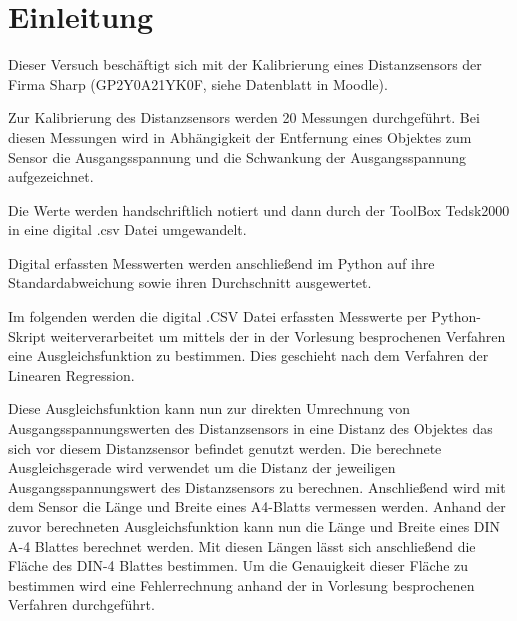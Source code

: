 \documentclass[12pt, oneside, a4paper, \docLanguage]{report}
\begin{document}

\setcounter{section}{0}



\clearpage

%
%


%
%


%
%


%
%




\setcounter{page}{1} 
\pagestyle{default}
%
%
\chapter{Einleitung}
\label{chap:EINL}
Dieser Versuch beschäftigt sich mit der Kalibrierung eines Distanzsensors der Firma Sharp (GP2Y0A21YK0F, siehe Datenblatt in Moodle).

Zur Kalibrierung des Distanzsensors werden 20 Messungen durchgeführt. Bei diesen Messungen wird in Abhängigkeit der Entfernung eines Objektes zum Sensor die Ausgangsspannung und die Schwankung der Ausgangsspannung aufgezeichnet.

Die Werte werden handschriftlich notiert und dann durch der ToolBox Tedsk2000 in eine digital .csv Datei umgewandelt.

Digital erfassten Messwerten werden anschließend im Python auf ihre Standardabweichung sowie ihren Durchschnitt ausgewertet.

Im folgenden werden die digital .CSV Datei erfassten Messwerte per Python-Skript weiterverarbeitet um mittels der in der Vorlesung besprochenen Verfahren eine Ausgleichsfunktion zu bestimmen. Dies geschieht nach dem Verfahren der Linearen Regression.

Diese Ausgleichsfunktion kann nun zur direkten Umrechnung von Ausgangsspannungswerten des Distanzsensors in eine Distanz des Objektes das sich vor diesem Distanzsensor befindet genutzt werden.
Die berechnete Ausgleichsgerade wird verwendet um die Distanz der jeweiligen Ausgangsspannungswert des Distanzsensors zu berechnen. 
Anschließend wird mit dem Sensor die Länge und Breite eines A4-Blatts vermessen werden. Anhand der zuvor berechneten Ausgleichsfunktion kann nun die Länge und Breite eines DIN A-4 Blattes berechnet werden.
Mit diesen Längen lässt sich anschließend die Fläche des DIN-4 Blattes bestimmen.
Um die Genauigkeit dieser Fläche zu bestimmen wird eine Fehlerrechnung anhand der in Vorlesung besprochenen Verfahren durchgeführt.
\end{document}
